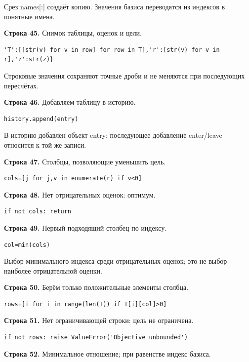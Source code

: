 \documentclass[12pt,a4paper]{article}
\begin{document}
Срез names[:] создаёт копию. Значения базиса переводятся из индексов в понятные имена.
\par\textbf{Строка 45.} Снимок таблицы, оценок и цели.
\begin{Verbatim}[fontsize=\small,breaklines=true,breakanywhere=true]
               'T':[[str(v) for v in row] for row in T],'r':[str(v) for v in r],'z':str(z)}
\end{Verbatim}
Строковые значения сохраняют точные дроби и не меняются при последующих пересчётах.
\par\textbf{Строка 46.} Добавляем таблицу в историю.
\begin{Verbatim}[fontsize=\small,breaklines=true,breakanywhere=true]
        history.append(entry)
\end{Verbatim}
В историю добавлен объект entry; последующее добавление enter/leave относится к той же записи.
\par\textbf{Строка 47.} Столбцы, позволяющие уменьшить цель.
\begin{Verbatim}[fontsize=\small,breaklines=true,breakanywhere=true]
        cols=[j for j,v in enumerate(r) if v<0]
\end{Verbatim}
\par\textbf{Строка 48.} Нет отрицательных оценок: оптимум.
\begin{Verbatim}[fontsize=\small,breaklines=true,breakanywhere=true]
        if not cols: return
\end{Verbatim}
\par\textbf{Строка 49.} Первый подходящий столбец по индексу.
\begin{Verbatim}[fontsize=\small,breaklines=true,breakanywhere=true]
        col=min(cols)
\end{Verbatim}
Выбор минимального индекса среди отрицательных оценок; это не выбор наиболее отрицательной оценки.
\par\textbf{Строка 50.} Берём только положительные элементы столбца.
\begin{Verbatim}[fontsize=\small,breaklines=true,breakanywhere=true]
        rows=[i for i in range(len(T)) if T[i][col]>0]
\end{Verbatim}
\par\textbf{Строка 51.} Нет ограничивающей строки: цель не ограничена.
\begin{Verbatim}[fontsize=\small,breaklines=true,breakanywhere=true]
        if not rows: raise ValueError('Objective unbounded')
\end{Verbatim}
\par\textbf{Строка 52.} Минимальное отношение; при равенстве индекс базиса.
\end{document}
